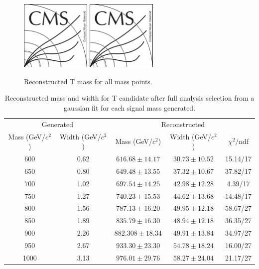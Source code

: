 \begin{figure}[!Hhtbp]
  \begin{center}
    \includegraphics[width=0.3\textwidth]{figs/CMSlogo.png}
    \includegraphics[width=0.3\textwidth]{figs/CMSlogo.png}
    \caption{Reconstructed T mass for all mass points.}
    \label{fig:RecT}
  \end{center}
\end{figure}\clearpage

\begin{table}[htbH]
\begin{center}
\begin{tabular}{|c|c|c|c|c|}
\hline 
\multicolumn{2}{|c}{Generated} & \multicolumn{3}{|c|}{Reconstructed} \\
Mass (GeV/$c^{2}$) & Width (GeV/$c^{2}$) & Mass (GeV/$c^{2}$) & Width (GeV/$c^{2}$) & $\chi^{2} /$ndf\\
\hline
600 & 0.62 &$616.68\pm14.17$ & $30.73\pm10.52$ & 15.14/17\\
650 & 0.80 &$649.48\pm13.55$ & $37.32\pm10.67$ & 37.82/17\\
700 & 1.02 &$697.54\pm14.25$ & $42.98\pm12.28$ & 4.39/17\\
750 & 1.27 &$740.23\pm15.53$ & $44.62\pm13.68$ & 14.48/17\\
800 & 1.56 &$787.13\pm16.20$ & $49.95\pm12.18$ & 58.67/27\\
850 & 1.89 &$835.79\pm16.30$ & $48.94\pm12.18$ & 36.35/27\\
900 & 2.26 &$882.308\pm18.34$ & $49.91\pm13.84$ & 34.97/27\\
950 & 2.67 &$933.30\pm23.30$ & $54.78\pm18.24$ & 16.00/27\\
1000 & 3.13 &$976.01\pm29.76$ & $58.27\pm24.04$ & 21.17/27\\
\hline
\end{tabular}
\caption{Reconstructed mass and width for T candidate after full analysis selection from a gaussian fit for each signal mass generated. \label{tab:SignalWidths}}
\end{center}
\end{table}

